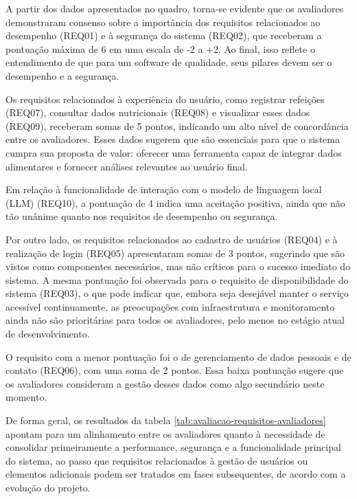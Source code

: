 A partir dos dados apresentados no quadro, torna-se evidente que os avaliadores demonstraram consenso sobre a importância dos requisitos relacionados ao desempenho (REQ01) e à segurança do sistema (REQ02), que receberam a pontuação máxima de 6 em uma escala de -2 a +2. Ao final, isso reflete o entendimento de que para um software de qualidade, seus pilares devem ser o desempenho e a segurança.

Os requisitos relacionados à experiência do usuário, como registrar refeições (REQ07), consultar dados nutricionais (REQ08) e visualizar esses dados (REQ09), receberam somas de 5 pontos, indicando um alto nível de concordância entre os avaliadores. Esses dados sugerem que são essenciais para que o sistema cumpra sua proposta de valor: oferecer uma ferramenta capaz de integrar dados alimentares e fornecer análises relevantes ao usuário final.

Em relação à funcionalidade de interação com o modelo de linguagem local (LLM) (REQ10), a pontuação de 4 indica uma aceitação positiva, ainda que não tão unânime quanto nos requisitos de desempenho ou segurança.

Por outro lado, os requisitos relacionados ao cadastro de usuários (REQ04) e à realização de login (REQ05) apresentaram somas de 3 pontos, sugerindo que são vistos como componentes necessários, mas não críticos para o sucesso imediato do sistema. A mesma pontuação foi observada para o requisito de disponibilidade do sistema (REQ03), o que pode indicar que, embora seja desejável manter o serviço acessível continuamente, as preocupações com infraestrutura e monitoramento ainda não são prioritárias para todos os avaliadores, pelo menos no estágio atual de desenvolvimento.

O requisito com a menor pontuação foi o de gerenciamento de dados pessoais e de contato (REQ06), com uma soma de 2 pontos. Essa baixa pontuação sugere que os avaliadores consideram a gestão desses dados como algo secundário neste momento.

De forma geral, os resultados da tabela \ref{tab:avaliacao-requisitos-avaliadores} apontam para um alinhamento entre os avaliadores quanto à necessidade de consolidar primeiramente a performance, segurança e a funcionalidade principal do sistema, ao passo que requisitos relacionados à gestão de usuários ou elementos adicionais podem ser tratados em fases subsequentes, de acordo com a evolução do projeto.
